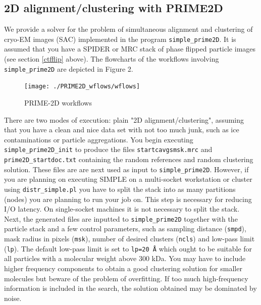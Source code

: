 \documentclass[a4paper,11pt]{article}
\newcommand{\prgname}[1]{\textcolor{NavyBlue}{\texttt{#1}}}
\begin{document}
\subsection{2D alignment/clustering with PRIME2D}
\label{prime2D}
We provide a solver for the problem of simultaneous alignment and clustering of cryo-EM images (SAC) implemented in the program \prgname{simple\_prime2D}. It is assumed that you have a SPIDER or MRC stack of phase flipped particle images (see section \ref{ctfflip} above). The flowcharts of the workflows involving \prgname{simple\_prime2D} are depicted in Figure 2. 
\begin{figure}
\texttt{[image: ./PRIME2D\_wflows/wflows]}
\caption{PRIME-2D workflows}
\end{figure}
There are two modes of execution: plain "2D alignment/clustering", assuming that you have a clean and nice data set with not too much junk, such as ice contaminations or particle aggregations. You begin executing \prgname{simple\_prime2D\_init} to produce the files \texttt{startcavgsmsk.mrc} and \texttt{prime2D\_startdoc.txt} containing the random references and random clustering solution. These files are are next used as input to \prgname{simple\_prime2D}. However, if you are planning on executing SIMPLE on a multi-socket workstation or cluster using \prgname{distr\_simple.pl} you have to split the stack into as many partitions (nodes) you are planning to run your job on. This step is necessary for reducing I/O latency. On single-socket machines it is not necessary to split the stack. Next, the generated files are inputted to \prgname{simple\_prime2D} together with the particle stack and a few control parameters, such as sampling distance (\texttt{smpd}), mask radius in pixels (\texttt{msk}), number of desired clusters (\texttt{ncls}) and low-pass limit (\texttt{lp}). The default low-pass limit is set to \texttt{lp=20 \AA{}} which ought to be suitable for all particles with a molecular weight above 300 kDa. You may have to include higher frequency components to obtain a good clustering solution for smaller molecules but beware of the problem of overfitting. If too much high-frequency information is included in the search, the solution obtained may be dominated by noise.
\end{document}
